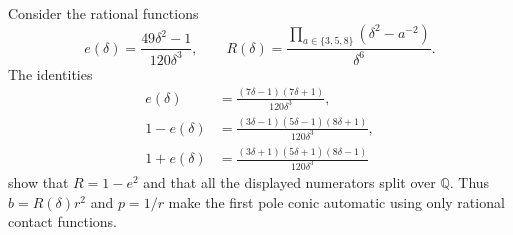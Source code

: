 \documentclass[11pt,a4paper]{article}
\theoremstyle{definition}\newtheorem{definition}[theorem]{Definition}
\newcommand{\Q}{\mathbb Q}\newcommand{\Z}{\mathbb Z}
\begin{document}
Consider the rational functions
\begin{equation}\label{eq:split}
 e(\delta)=\frac{49\delta^2-1}{120\delta^3},\qquad
 R(\delta)=\frac{\displaystyle\prod_{a\in\{3,5,8\}}
                    (\delta^2-a^{-2})}{\delta^6}.
\end{equation}
The identities
\begin{equation}\label{eq:splitids}
 \begin{split}
 e(\delta)&=\frac{(7\delta-1)(7\delta+1)}{120\delta^3},\\
 1-e(\delta)&=\frac{(3\delta-1)(5\delta-1)(8\delta+1)}{120\delta^3},\\
 1+e(\delta)&=\frac{(3\delta+1)(5\delta+1)(8\delta-1)}{120\delta^3}
 \end{split}
\end{equation}
show that $R=1-e^2$ and that all the displayed numerators split over $\Q$.
Thus $b=R(\delta)r^2$ and $p=1/r$ make the first pole conic automatic
using only rational contact functions.
\end{document}
